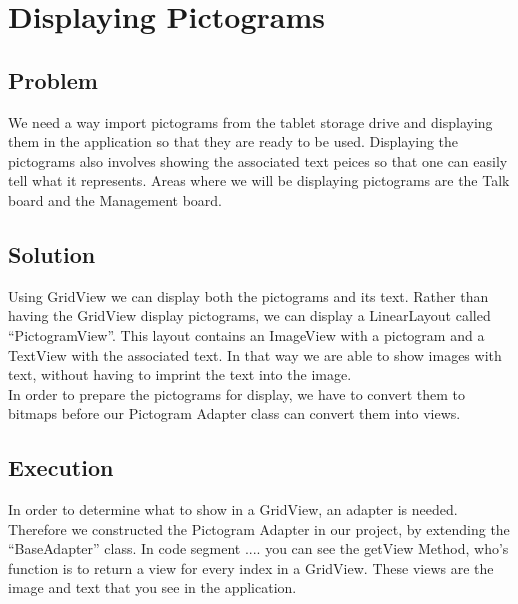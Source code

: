 \section{Displaying Pictograms} %
\label{disppict}

\subsection{Problem}
We need a way import pictograms from the tablet storage drive and displaying them in the application so that they are ready to be used.
Displaying the pictograms also involves showing the associated text peices so that one can easily tell what it represents.
Areas where we will be displaying pictograms are the Talk board and the Management board.

\subsection{Solution}
Using GridView we can display both the pictograms and its text.
Rather than having the GridView display pictograms, we can display a LinearLayout called ``PictogramView''.
This layout contains an ImageView with a pictogram and a TextView with the associated text.
In that way we are able to show images with text, without having to imprint the text into the image.\\

In order to prepare the pictograms for display, we have to convert them to bitmaps before our Pictogram Adapter class can convert them into views.

\subsection{Execution}
In order to determine what to show in a GridView, an adapter is needed. Therefore we constructed the Pictogram Adapter in our project, by extending the ``BaseAdapter'' class.
In code segment .... you can see the getView Method, who's function is to return a view for every index in a GridView.
These views are the image and text that you see in the application.\\


